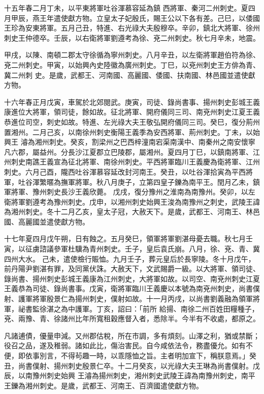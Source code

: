 \begin{pinyinscope}
 十五年春二月丁未，以平東將軍吐谷渾慕容延為鎮
 西將軍、秦河二州刺史。夏四月甲辰，燕王年遣使獻方物。立皇太子妃殷氏，賜王公以下各有差。己巳，以倭國王珍為安東將軍。五月己丑，特進、右光祿大夫殷穆卒。辛卯，鎮北大將軍、徐州刺史王仲德卒。壬辰，以右衛將軍劉遵考為徐、兗二州刺史。秋七月辛未，地震。



 甲戌，以陳、南頓二郡太守徐循為寧州刺史。八月辛丑，以左衛將軍趙伯符為徐、兗二州刺史。甲寅，以始興內史陸徽為廣州刺史。丁巳，以兗州刺史王方俳為青、冀二州刺
 史。是歲，武都王、河南國、高麗國、倭國、扶南國、林邑國並遣使獻方物。



 十六年春正月戊寅，車駕於北郊閱武。庚寅，司徒、錄尚書事、揚州刺史彭城王義康進位大將軍，領司徒，餘如故。征北將軍、開府儀同三司、南兗州刺史江夏王義恭進位司空，刺史如故。特進、左光祿大夫王敬弘開府儀同三司。癸巳，復分荊州置湘州。二月己亥，以南徐州刺史衡陽王義季為安西將軍、荊州刺史。丁未，以始興王
 濬為湘州刺史。癸亥，割梁州之巴西梓潼南宕渠南漢中、南秦州之南安懷寧凡六郡，屬益州。分長沙江夏郡立巴陵郡，屬湘州。夏四月丁巳，以鎮南將軍、江州刺史南譙王義宣為征北將軍、南徐州刺史。平西將軍臨川王義慶為衛將軍、江州刺史。六月己酉，隴西吐谷渾慕容延改封河南王。癸丑，以吐谷渾拾寅為平西將軍，吐谷渾繁暱為撫軍將軍。秋八月庚子，立第四皇子鑠為南平王。閏月乙未，鎮軍將軍、豫州刺史長沙王義欣薨。
 戊戌，復分豫州之淮南為南豫州。癸卯，以左衛將軍劉遵考為豫州刺史。戊申，以湘州刺史始興王浚為南豫州之刺史，武陵王諱為湘州刺史。冬十二月乙亥，皇太子冠，大赦天下。是歲，武都王、河南王、林邑國、高麗國並遣使獻方物。



 十七年夏四月戊午朔，日有蝕之。五月癸巳，領軍將軍劉湛母憂去職。秋七月壬寅，以征虜諮議參軍杜驥為青州刺史。壬子，皇后袁氏崩。八月，徐、兗、青、冀四州大水。
 己未，遣使檢行賑恤。九月壬子，葬元皇后於長寧陵。冬十月戊午，前丹陽尹劉湛有罪，及同黨伏誅。大赦天下，文武賜爵一級。以大將軍、領司徒、錄尚書、揚州刺史彭城王義康為江州刺史，大將軍如故。以司空、南兗州刺史江夏王義恭為司徒、錄尚書事。戊寅，衛將軍臨川王義慶以本號為南兗州刺史，尚書僕射、護軍將軍殷景仁為揚州刺史，僕射如故。十一月丙戌，以尚書劉義融為領軍將軍，祕書監徐湛之為中護軍。丁亥，詔曰：「前所
 給揚、南徐二州百姓田糧種子，兗、兩豫、青、徐諸州比年所寬租穀應督入者，悉除半。今半有不收處，都原之。



 凡諸逋債，優量申減。又州郡估稅，所在市調，多有煩刻。山澤之利，猶或禁斷；役召之品，遂及稚弱。諸如此比，傷治害民。自今咸依法令，務盡優允。如有不便，即依事別言，不得茍趣一時，以乖隱恤之旨。主者明加宣下，稱朕意焉。」癸丑，尚書僕射、揚州刺史殷景仁卒。十二月癸亥，以光祿大夫王琳為尚書僕射。戊辰，以南豫州刺史始興
 王濬為揚州刺史，湘州刺史武陵王諱為南豫州刺史，南平王鑠為湘州刺史。是歲，武都王、河南王、百濟國遣使獻方物。




\end{pinyinscope}
